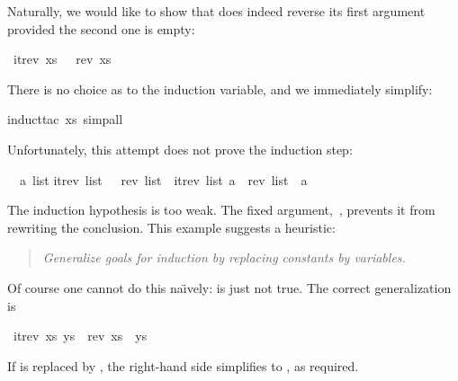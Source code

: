 \begin{isabellebody}
\begin{isamarkuptext}
Naturally, we would like to show that  does indeed reverse
its first argument provided the second one is empty:%
\end{isamarkuptext}%
\isamarkuptrue%
\isamarkupfalse%
\ {}itrev\ xs\ {}{}\ {}\ rev\ xs{}%
\isadelimproof
%
\endisadelimproof
%
\isatagproof
%
\begin{isamarkuptxt}%
\noindent
There is no choice as to the induction variable, and we immediately simplify:%
\end{isamarkuptxt}%
\isamarkuptrue%
\isamarkupfalse%
{}induct{}tac\ xs{}\ simp{}all{}%
\begin{isamarkuptxt}%
\noindent
Unfortunately, this attempt does not prove
the induction step:
\begin{isabelle}%
\ {}{}\ {}a\ list{}\isanewline
{}itrev\ list\ {}{}\ {}\ rev\ list\ {}\ itrev\ list\ {}a{}\ {}\ rev\ list\ {}\ {}a{}%
\end{isabelle}
The induction hypothesis is too weak.  The fixed
argument,~, prevents it from rewriting the conclusion.  
This example suggests a heuristic:
\begin{quote}%
\emph{Generalize goals for induction by replacing constants by variables.}
\end{quote}
Of course one cannot do this na\"{\i}vely:  is
just not true.  The correct generalization is%
\end{isamarkuptxt}%
\isamarkuptrue%
%
\endisatagproof
{\isafoldproof}%
%
\isadelimproof
%
\endisadelimproof
{}\isamarkupfalse%
\ {}itrev\ xs\ ys\ {}\ rev\ xs\ {}\ ys{}%
\isadelimproof
%
\endisadelimproof
%
\isatagproof
%
\begin{isamarkuptxt}%
\noindent
If  is replaced by , the right-hand side simplifies to
, as required.


\end{isamarkuptxt}
\end{isabellebody}
